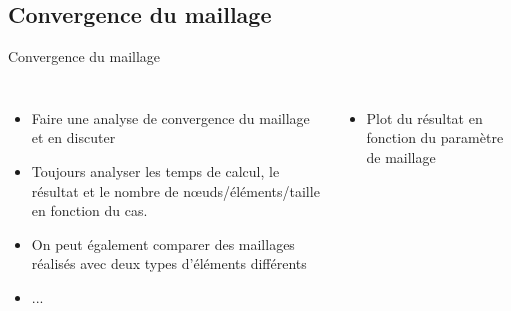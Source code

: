 \subsection{Convergence du maillage}
\label{sec:Convergence du maillage}

\begin{frame}[c]{Convergence du maillage}
  \begin{columns}
        \begin{itemize}
            \item Faire une analyse de convergence du maillage et en discuter
            \item Toujours analyser les temps de calcul, le résultat et le nombre de nœuds/éléments/taille en fonction du cas.
            \item On peut également comparer des maillages réalisés avec deux types d'éléments différents
            \item ...
        \end{itemize}
    \begin{itemize}
        \item Plot du résultat en fonction du paramètre de maillage
    \end{itemize}
  \end{columns}
\end{frame}